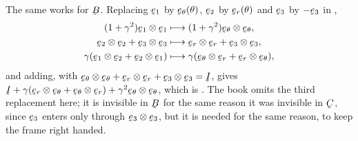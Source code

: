 The same works for $\bB$. Replacing $\be_{1}$ by $\bet(\theta)$,
$\be_{2}$ by $\ber(\theta)$ and $\be_{3}$ by $-\be_{3}$ in ,
\[
\begin{aligned}
   (1+\gamma^{2})\be_{1}\otimes\be_{1}&\longmapsto
     (1+\gamma^{2})\bet\otimes\bet,\\
   \be_{2}\otimes\be_{2}+\be_{3}\otimes\be_{3}&\longmapsto
     \ber\otimes\ber+\be_{3}\otimes\be_{3},\\
   \gamma(\be_{1}\otimes\be_{2}+\be_{2}\otimes\be_{1})&\longmapsto
     \gamma(\bet\otimes\ber+\ber\otimes\bet),
\end{aligned}
\]
and adding, with $\bet\otimes\bet+\ber\otimes\ber+\be_{3}\otimes\be_{3}
=\I$, gives
$\I+\gamma(\ber\otimes\bet+\bet\otimes\ber)+\gamma^{2}\bet\otimes\bet$,
which is . The book omits the third replacement here; it is
invisible in $\bB$ for the same reason it was invisible in $\bC$, since
$\be_{3}$ enters only through $\be_{3}\otimes\be_{3}$, but it is needed
for the same reason, to keep the frame right handed.

